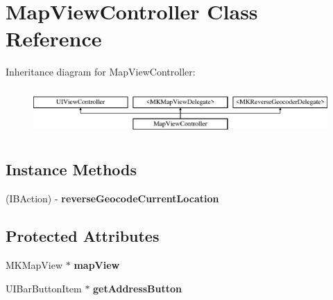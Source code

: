 \hypertarget{interface_map_view_controller}{\section{Map\-View\-Controller Class Reference}
\label{interface_map_view_controller}
}
Inheritance diagram for Map\-View\-Controller\-:\begin{figure}[H]
\begin{center}
\leavevmode
\includegraphics[height=1.812298cm]{interface_map_view_controller}
\end{center}
\end{figure}
\subsection*{Instance Methods}
\begin{DoxyCompactItemize}
\item 
\hypertarget{interface_map_view_controller_ab3f6d11f99f3a24c5c81b3d5e00a97dd}{(I\-B\-Action) -\/ {\bfseries reverse\-Geocode\-Current\-Location}}\label{interface_map_view_controller_ab3f6d11f99f3a24c5c81b3d5e00a97dd}

\end{DoxyCompactItemize}
\subsection*{Protected Attributes}
\begin{DoxyCompactItemize}
\item 
\hypertarget{interface_map_view_controller_aeca56f93083ef15cb818d6627fc0afda}{M\-K\-Map\-View $\ast$ {\bfseries map\-View}}\label{interface_map_view_controller_aeca56f93083ef15cb818d6627fc0afda}

\item 
\hypertarget{interface_map_view_controller_a05820496aedc25682d9ea8f016872903}{U\-I\-Bar\-Button\-Item $\ast$ {\bfseries get\-Address\-Button}}\label{interface_map_view_controller_a05820496aedc25682d9ea8f016872903}

\end{DoxyCompactItemize}
